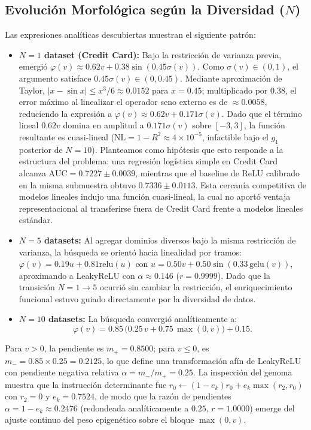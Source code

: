 \documentclass[10pt,twocolumn,letterpaper]{article}
\newcommand{\AUC}{\mathrm{AUC}}
\begin{document}
\subsection{Evolución Morfológica según la Diversidad ($N$)}
Las expresiones analíticas descubiertas muestran el siguiente patrón:
\begin{itemize}[leftmargin=1.2em]
  \item \textbf{$N = 1$ dataset (Credit Card):} Bajo la restricción de varianza previa, emergió $\varphi(v) \approx 0.62 v + 0.38 \sin(0.45 \sigma(v))$. Como $\sigma(v) \in (0, 1)$, el argumento satisface $0.45 \sigma(v) \in (0, 0.45)$. Mediante aproximación de Taylor, $|x - \sin x| \le x^3 / 6 \approx 0.0152$ para $x=0.45$; multiplicado por $0.38$, el error máximo al linealizar el operador seno externo es de $\approx 0.0058$, reduciendo la expresión a $\varphi(v) \approx 0.62 v + 0.171 \sigma(v)$. Dado que el término lineal $0.62v$ domina en amplitud a $0.171\sigma(v)$ sobre $[-3, 3]$, la función resultante es cuasi-lineal ($\mathrm{NL} = 1 - R^2 \approx 4\times 10^{-5}$, infactible bajo el $g_1$ posterior de $N=10$). Planteamos como hipótesis que esto responde a la estructura del problema: una regresión logística simple en Credit Card alcanza $\AUC = 0.7227 \pm 0.0039$, mientras que el baseline de ReLU calibrado en la misma submuestra obtuvo $0.7336 \pm 0.0113$. Esta cercanía competitiva de modelos lineales indujo una función cuasi-lineal, la cual no aportó ventaja representacional al transferirse fuera de Credit Card frente a modelos lineales estándar.
  \item \textbf{$N = 5$ datasets:} Al agregar dominios diversos bajo la misma restricción de varianza, la búsqueda se orientó hacia linealidad por tramos: $\varphi(v) = 0.19 u + 0.81 \mathrm{relu}(u)$ con $u = 0.50 v + 0.50 \sin(0.33\,\mathrm{gelu}(v))$, aproximando a LeakyReLU con $\alpha \approx 0.146$ ($r = 0.9999$). Dado que la transición $N=1 \to 5$ ocurrió sin cambiar la restricción, el enriquecimiento funcional estuvo guiado directamente por la diversidad de datos.
  \item \textbf{$N = 10$ datasets:} La búsqueda convergió analíticamente a:
  \begin{equation}
    \varphi(v) = 0.85\,\bigl(0.25\,v + 0.75\,\max(0, v)\bigr) + 0.15.
  \end{equation}
\end{itemize}

Para $v > 0$, la pendiente es $m_+ = 0.8500$; para $v \le 0$, es $m_- = 0.85 \times 0.25 = 0.2125$, lo que define una transformación afín de LeakyReLU con pendiente negativa relativa $\alpha = m_- / m_+ = 0.25$. La inspección del genoma muestra que la instrucción determinante fue $r_0 \leftarrow (1 - e_k)r_0 + e_k \max(r_2, r_0)$ con $r_2=0$ y $e_k = 0.7524$, de modo que la razón de pendientes $\alpha = 1 - e_k \approx 0.2476$ (redondeada analíticamente a $0.25$, $r=1.0000$) emerge del ajuste continuo del peso epigenético sobre el bloque $\max(0, v)$.
\end{document}
